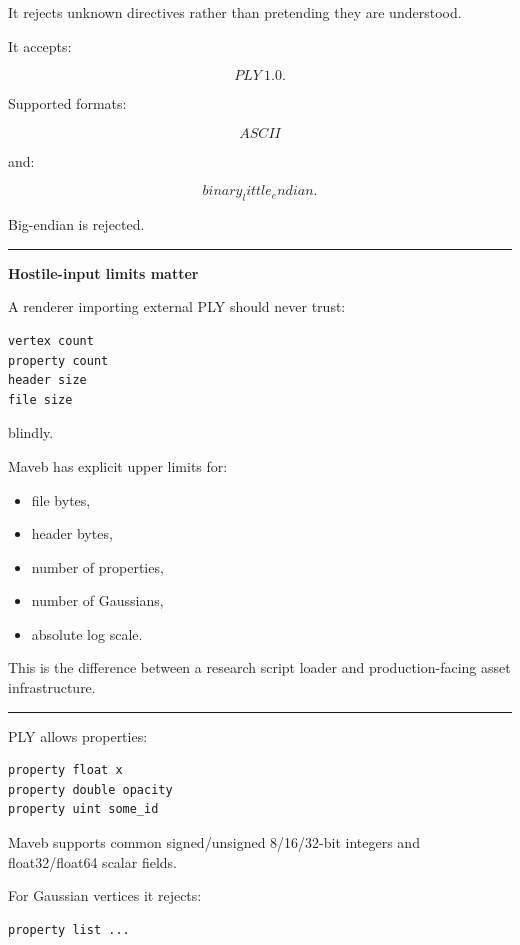 It rejects unknown directives rather than pretending they are understood.

It accepts:

\[
PLY\ 1.0.
\]

Supported formats:

\[
ASCII
\]

and:

\[
binary_little_endian.
\]

Big-endian is rejected.

\begin{center}\rule{0.5\linewidth}{0.5pt}\end{center}

\textbf{Hostile-input limits matter}

A renderer importing external PLY should never trust:

\protect{}\label{ye44ct}%
\begin{verbatim}
vertex count
property count
header size
file size
\end{verbatim}

blindly.

Maveb has explicit upper limits for:

\begin{itemize}
\tightlist
\item
  file bytes,
\item
  header bytes,
\item
  number of properties,
\item
  number of Gaussians,
\item
  absolute log scale.
\end{itemize}

This is the difference between a research script loader and production-facing asset infrastructure.

\begin{center}\rule{0.5\linewidth}{0.5pt}\end{center}

PLY allows properties:

\protect{}\label{68k852}%
\begin{verbatim}
property float x
property double opacity
property uint some_id
\end{verbatim}

Maveb supports common signed/unsigned 8/16/32-bit integers and float32/float64 scalar fields.

For Gaussian vertices it rejects:

\protect{}\label{gkre1f}%
\begin{verbatim}
property list ...
\end{verbatim}

